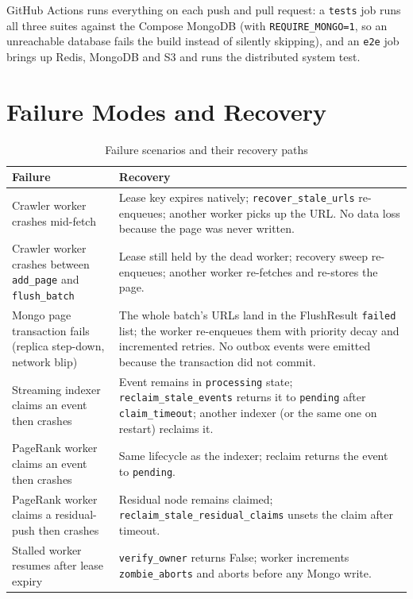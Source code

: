 \documentclass[11pt,a4paper]{article}
\newcommand{\code}[1]{\texttt{#1}}
\begin{document}
GitHub Actions runs everything on each push and pull request: a \code{tests} job runs all three suites against the Compose MongoDB (with \code{REQUIRE\_MONGO=1}, so an unreachable database fails the build instead of silently skipping), and an \code{e2e} job brings up Redis, MongoDB and S3 and runs the distributed system test.

\section{Failure Modes and Recovery}

\begin{table}[H]
\centering
\caption{Failure scenarios and their recovery paths}
\small
\begin{tabular}{p{}p{}}
\toprule
Failure & Recovery \\
\midrule
Crawler worker crashes mid-fetch & Lease key expires natively; \code{recover\_stale\_urls} re-enqueues; another worker picks up the URL. No data loss because the page was never written.\\
Crawler worker crashes between \code{add\_page} and \code{flush\_batch} & Lease still held by the dead worker; recovery sweep re-enqueues; another worker re-fetches and re-stores the page.\\
Mongo page transaction fails (replica step-down, network blip) & The whole batch's URLs land in the FlushResult \code{failed} list; the worker re-enqueues them with priority decay and incremented retries. No outbox events were emitted because the transaction did not commit.\\
Streaming indexer claims an event then crashes & Event remains in \code{processing} state; \code{reclaim\_stale\_events} returns it to \code{pending} after \code{claim\_timeout}; another indexer (or the same one on restart) reclaims it.\\
PageRank worker claims an event then crashes & Same lifecycle as the indexer; reclaim returns the event to \code{pending}.\\
PageRank worker claims a residual-push then crashes & Residual node remains claimed; \code{reclaim\_stale\_residual\_claims} unsets the claim after timeout.\\
Stalled worker resumes after lease expiry & \code{verify\_owner} returns False; worker increments \code{zombie\_aborts} and aborts before any Mongo write.\\

\end{tabular}
\end{table}
\end{document}
